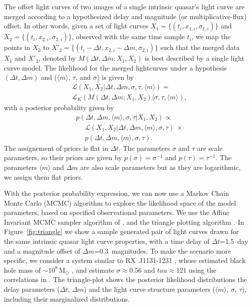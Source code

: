 \documentclass{emulateapj}
\begin{document}
The offset light curves of two images of a single intrinsic quasar's
light curve are merged according to a hypothesized delay and magnitude
(or multiplicative-flux) offset. In other words, given a set of light
curves $X_1 = \{(t_{i},x_{1,i},\sigma_{1,i})\}$ and $X_2 =
\{(t_{i},x_{2,i},\sigma_{2,i})\}$, observed with the same time sample
$t_i$, we map the points in $X_2$ to $X'_2 = \{(t_{i}-\Delta
t,x_{2,i}-\Delta m,\sigma_{2,i})\}$ such that the merged data $X_1$
and $X'_2$, denoted by $M(\Delta t, \Delta m ; X_1, X_2)$ is best
described by a single light curve model. The likelihood for the merged
lightcurves under a hypothesis $(\Delta t, \Delta m)$ and ($\langle
m\rangle$, $\tau$, and $\sigma$) is given by
\begin{align}
& \mathcal L (X_1, X_2 | \Delta t, \Delta m, \sigma, \tau, \langle m \rangle)  = \nonumber \\
& \mathcal{L}_{K} \left( M(\Delta
  t,\Delta m ; X_1, X_2) | \sigma, \tau, \langle m \rangle \right), 
\end{align}
with a posterior probability given by
\begin{align}
& p(\Delta t, \Delta m, \langle m \rangle, \sigma,\tau | X_1, X_2) \propto \nonumber \\
&  \ \ \ \ \ \ \mathcal{L}(X_1, X_2 | \Delta t, \Delta m, \langle m \rangle,
\sigma,\tau)\ \times\nonumber\\
&  \ \ \ \ \ \   p(\Delta t, \Delta m, \langle m \rangle,
\sigma,\tau). 
\end{align}
The assignement of priors is flat in $\Delta t$. The parameters
$\sigma$ and $\tau$ are scale parameters, so their priors are given by
$p(\sigma)=\sigma^{-1}$ and $p(\tau)=\tau^{-1}$. The parameters
$\langle m \rangle$ and $\Delta m$ are also scale parameters but as
they are logarithmic, we assign them flat priors.  

With the posterior probability expression, we can now use a Markov
Chain Monte Carlo (MCMC) algorithm to explore the likelihood space of
the model parameters, based on specified observational parameters. We
use the Affine Invariant MCMC sampler algorithm of
\citet{Foreman-Mackey2013a}, and the triangle plotting algorithm
\citet{Foreman-Mackey2014a}.  In Figure~\ref{fig:triangle} we show a
sample generated pair of light curves drawn for the same intrinsic
quasar light curve properties, with a time delay of $\Delta t$=1.5~day
and a magnitude offset of $\Delta m$=0.3~magnitudes. 
%
To make the scenario more specific, we consider a system similar to
RX~J1131-1231 \citep{Sluse2003a}, whose estimated black hole mass of
$\sim10^8$\,M$_{\odot}$ \citep{Dai2010a}, and estimate
$\sigma\approx0.56$ and $tau\approx121$ using the correlations in
\citet{MacLeod2010a}. 
%
The triangle-plot shows the posterior likelihood distributions the
delay parameters ($\Delta t$, $\Delta m$) and the light curve
structure parameters ($\langle m\rangle$, $\sigma$, $\tau$), including
their marginalized distributions.
\end{document}

